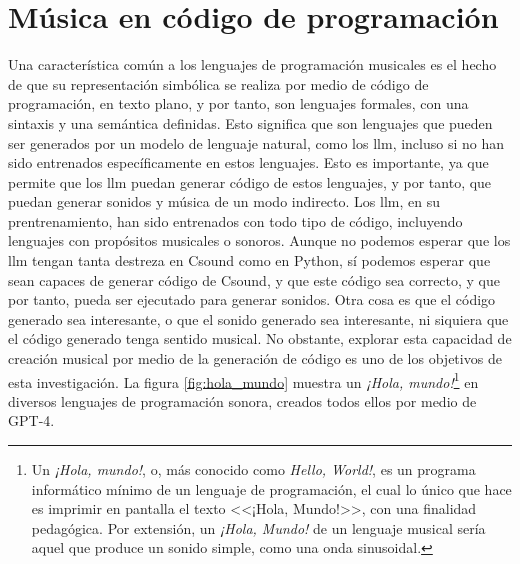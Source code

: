\section{Música en código de programación}

Una característica común a los lenguajes de programación musicales es el hecho de que su representación simbólica se realiza por medio de código de programación, en texto plano, y por tanto, son lenguajes formales, con una sintaxis y una semántica definidas. Esto significa que son lenguajes que pueden ser generados por un modelo de lenguaje natural, como los \gls{llm}, incluso si no han sido entrenados específicamente en estos lenguajes. Esto es importante, ya que permite que los \gls{llm} puedan generar código de estos lenguajes, y por tanto, que puedan generar sonidos y música de un modo indirecto. Los \gls{llm}, en su prentrenamiento, han sido entrenados con todo tipo de código, incluyendo lenguajes con propósitos musicales o sonoros. Aunque no podemos esperar que los \gls{llm} tengan tanta destreza en Csound como en Python, sí podemos esperar que sean capaces de generar código de Csound, y que este código sea correcto, y que por tanto, pueda ser ejecutado para generar sonidos. Otra cosa es que el código generado sea interesante, o que el sonido generado sea interesante, ni siquiera que el código generado tenga sentido musical. No obstante, explorar esta capacidad de creación musical por medio de la generación de código es uno de los objetivos de esta investigación. La figura \ref{fig:hola_mundo} muestra un \emph{¡Hola, mundo!}\footnote{Un \emph{¡Hola, mundo!}, o, más conocido como \emph{Hello, World!}, es un programa informático mínimo de un lenguaje de programación, el cual lo único que hace es imprimir en pantalla el texto <<¡Hola, Mundo!>>, con una finalidad pedagógica. Por extensión, un \emph{¡Hola, Mundo!} de un lenguaje musical sería aquel que produce un sonido simple, como una onda sinusoidal.} en diversos lenguajes de programación sonora, creados todos ellos por medio de GPT-4.

